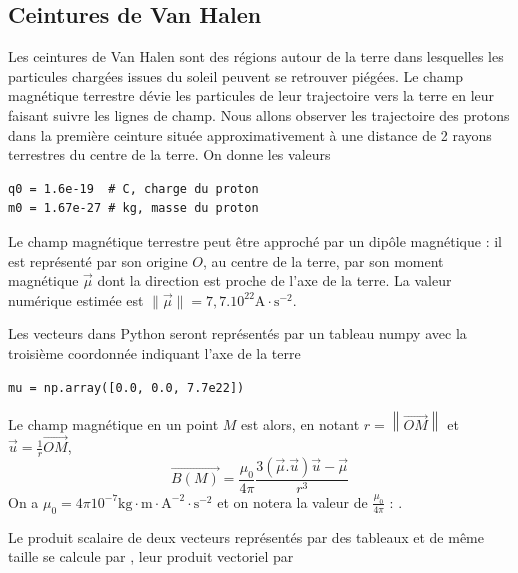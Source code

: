 \subsection{Ceintures de Van Halen}
Les ceintures de Van Halen sont des régions autour de la terre dans lesquelles les particules chargées issues du soleil peuvent se retrouver piégées. Le champ magnétique terrestre dévie les particules de leur trajectoire vers la terre en leur faisant suivre les lignes de champ. Nous allons observer les trajectoire des protons dans la première ceinture située approximativement à une distance de 2 rayons terrestres du centre de la terre. On donne les valeurs 
\begin{lstlisting}
q0 = 1.6e-19  # C, charge du proton
m0 = 1.67e-27 # kg, masse du proton
\end{lstlisting}

Le champ magnétique terrestre peut être approché par un dipôle magnétique  : il est représenté par son origine $O$, au centre de la terre, par son moment magnétique $\vec \mu$ dont la direction est proche de l'axe de la terre. La valeur numérique estimée est $\|\vec \mu\| = 7,7.10^{22}\text{A}\cdot \text{s}^{-2}$.

Les vecteurs dans {\sc Python} seront représentés par un tableau {\sc numpy} avec la troisième coordonnée indiquant l'axe de la terre
\begin{lstlisting}
mu = np.array([0.0, 0.0, 7.7e22])
\end{lstlisting}

Le champ magnétique en un point $M$ est alors, en notant $r = \left\|\overrightarrow{OM}\right\|$ et $\displaystyle \vec u = \frac 1 r\overrightarrow{OM}$,
\[\overrightarrow{B(M)} = \frac{\mu_0}{4\pi}\frac{3(\vec \mu.\vec u)\vec u - \vec \mu}{r^3}\]
On a $\mu_0=4\pi10^{-7}\text{kg}\cdot\text{m}\cdot\text{A}^{-2}\cdot\text{s}^{-2}$ et on notera  la valeur de $\displaystyle \frac{\mu_0}{4\pi}$ : .

Le produit scalaire de deux vecteurs représentés par des tableaux  et  de même taille se calcule par , leur produit vectoriel par 

